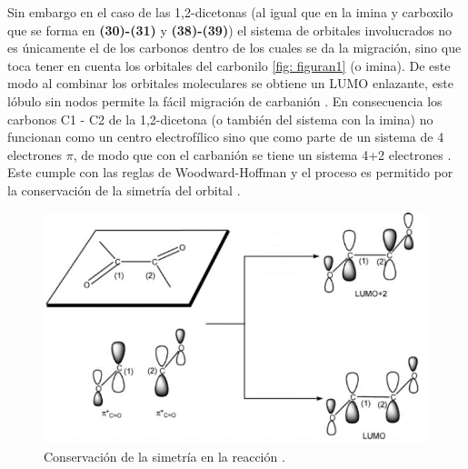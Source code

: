 \documentclass[fleqn,10pt]{SelfArx}
\begin{document}
Sin embargo en el caso de las 1,2-dicetonas (al igual que en la imina y carboxilo que se forma en \textbf{(30)-(31)} y \textbf{(38)-(39)})  el sistema de orbitales involucrados no es únicamente el de los carbonos dentro de los cuales se da la migración, sino que toca tener en cuenta los orbitales del carbonilo \autoref{fig: figuran1} (o imina). De este modo al combinar los orbitales moleculares se obtiene un LUMO enlazante, este lóbulo sin nodos permite la fácil migración de carbanión \cite{yamabe2006}. En consecuencia los carbonos C1 - C2 de la 1,2-dicetona (o también del sistema con la imina) no funcionan como un centro electrofílico sino que como parte de un sistema de 4 electrones $\pi$, de modo que con el carbanión se tiene un sistema 4+2 electrones \cite{yamabe2006}\cite{burke2007}. Este cumple con las reglas de Woodward-Hoffman y el proceso es permitido por la conservación de la simetría del orbital \cite{yamabe2006}.
\begin{figure}[h]
	\centering
	\includegraphics[width=\linewidth]{figuran1.png}
	\caption{Conservaci\'on de la simetr\'ia en la reacci\'on \cite{yamabe2006}.}
	\label{fig: figuran1}
\end{figure}
\end{document}
